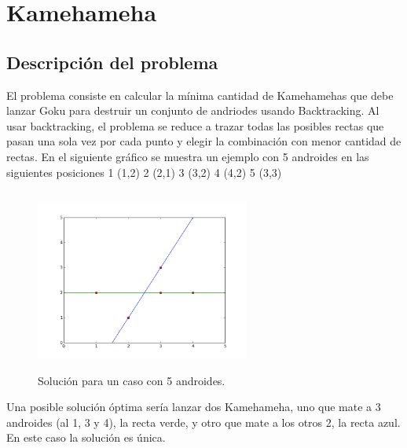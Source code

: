 \documentclass[10pt,a4paper]{article}
\begin{document}

\section{Kamehameha}

\subsection{Descripción del problema}

El problema consiste en calcular la mínima cantidad de Kamehamehas que debe lanzar Goku para destruir un conjunto de andriodes usando Backtracking.
Al usar backtracking, el problema se reduce a trazar todas las posibles rectas que pasan una sola vez por cada punto y elegir la combinación con menor cantidad de rectas. En el siguiente gráfico se muestra un ejemplo con 5 androides en las siguientes posiciones
1 (1,2) 2 (2,1) 3 (3,2) 4 (4,2) 5 (3,3)
\begin{figure}[h!]
  \centering
  \includegraphics[width=7cm, height=6cm]{ejemploHame1}
  \caption{Solución para un caso con 5 androides.}
\end{figure}

Una posible solución óptima sería lanzar dos Kamehameha, uno que mate a 3 androides (al 1, 3 y 4), la recta verde, y otro que mate a los otros 2, la recta azul. En este caso la solución es única.
\end{document}
